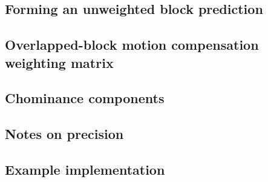 \subsection{Forming an unweighted block prediction}
\subsection{Overlapped-block motion compensation weighting matrix}
\subsection{Chominance components}
\subsection{Notes on precision}
\subsection{Example implementation}
